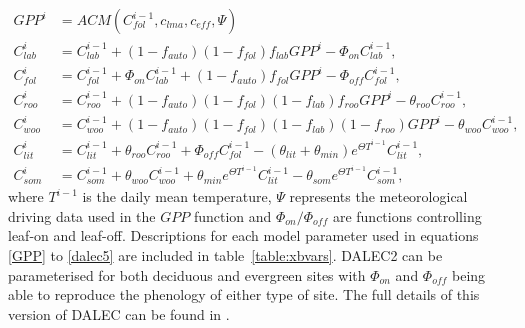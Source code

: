 \documentclass[draft,linenumbers]{agujournal}
\begin{document}
\begin{align}
GPP^{i} &= ACM(C_{fol}^{i-1}, c_{lma}, c_{eff}, \Psi) \label{GPP}
\\C_{lab}^{i}&=C_{lab}^{i-1}+(1-f_{auto})(1-f_{fol})f_{lab}GPP^{i}-\Phi _{on}C_{lab}^{i-1}, \label{daleclab}
\\C_{fol}^{i}&=C_{fol}^{i-1}+\Phi_{on}C_{lab}^{i-1}+(1-f_{auto})f_{fol}GPP^{i}-\Phi_{off}C_{fol}^{i-1}, \label{dalec1}
\\C_{roo}^{i}&=C_{roo}^{i-1}+(1-f_{auto})(1-f_{fol})(1-f_{lab})f_{roo}GPP^{i}-\theta_{roo}C_{roo}^{i-1}, 
\\C_{woo}^{i}&=C_{woo}^{i-1}+(1-f_{auto})(1-f_{fol})(1-f_{lab})(1-f_{roo})GPP^{i}-\theta_{woo}C_{woo}^{i-1}, 
\\C_{lit}^{i}&=C_{lit}^{i-1}+\theta_{roo}C_{roo}^{i-1}+\Phi_{off}C_{fol}^{i-1}-(\theta_{lit}+\theta_{min})e^{\Theta T^{i-1}}C_{lit}^{i-1}, 
\\C_{som}^{i}&=C_{som}^{i-1}+\theta_{woo}C_{woo}^{i-1}+\theta_{min}e^{\Theta T^{i-1}}C_{lit}^{i-1}-\theta_{som}e^{\Theta T^{i-1}}C_{som}^{i-1}, \label{dalec5}
\end{align}
where $T^{i-1}$ is the daily mean temperature, $\Psi$ represents the meteorological driving data used in the $GPP$ function and $\Phi_{on} / \Phi_{off}$ are functions controlling leaf-on and leaf-off. Descriptions for each model parameter used in equations \eqref{GPP} to \eqref{dalec5} are included in table~\ref{table:xbvars}. DALEC2 can be parameterised for both deciduous and evergreen sites with $\Phi_{on}$ and $\Phi_{off}$ being able to reproduce the phenology of either type of site. The full details of this version of DALEC can be found in \cite{Bloom2015}. 
\end{document}
